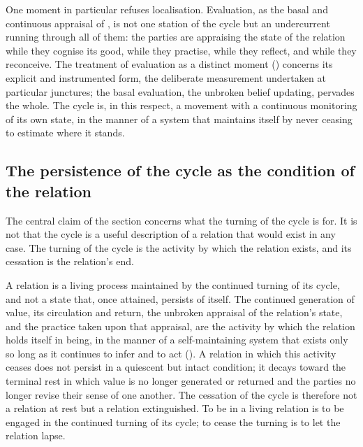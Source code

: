 One moment in particular refuses localisation. Evaluation, as the basal and continuous appraisal of , is not one station of the cycle but an undercurrent running through all of them: the parties are appraising the state of the relation while they cognise its good, while they practise, while they reflect, and while they reconceive. The treatment of evaluation as a distinct moment () concerns its explicit and instrumented form, the deliberate measurement undertaken at particular junctures; the basal evaluation, the unbroken belief updating, pervades the whole. The cycle is, in this respect, a movement with a continuous monitoring of its own state, in the manner of a system that maintains itself by never ceasing to estimate where it stands.

\subsection{The persistence of the cycle as the condition of the relation}
\label{p11:sec:cyc-persistence}

The central claim of the section concerns what the turning of the cycle is for. It is not that the cycle is a useful description of a relation that would exist in any case. The turning of the cycle is the activity by which the relation exists, and its cessation is the relation's end.

\begin{claim}
A relation is a living process maintained by the continued turning of its cycle, and not a state that, once attained, persists of itself. The continued generation of value, its circulation and return, the unbroken appraisal of the relation's state, and the practice taken upon that appraisal, are the activity by which the relation holds itself in being, in the manner of a self-maintaining system that exists only so long as it continues to infer and to act (). A relation in which this activity ceases does not persist in a quiescent but intact condition; it decays toward the terminal rest in which value is no longer generated or returned and the parties no longer revise their sense of one another. The cessation of the cycle is therefore not a relation at rest but a relation extinguished. To be in a living relation is to be engaged in the continued turning of its cycle; to cease the turning is to let the relation lapse.
\end{claim}

